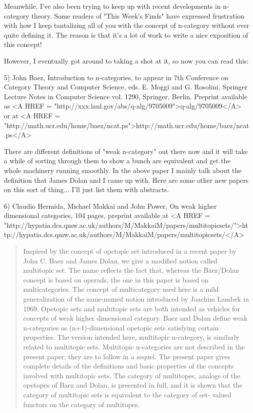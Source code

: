 Meanwhile, I've also been trying to keep up with recent developments
in n-category theory.  Some readers of "This Week's Finds" have expressed
frustration with how I keep tantalizing all of you with the concept of
n-category without ever quite defining it.  The reason is that it's a
lot of work to write a nice exposition of this concept!  

However, I eventually got around to taking a shot at it, so now you can
read this:

5) John Baez, Introduction to n-categories, to appear in
7th Conference on Category Theory and Computer Science, eds.
E. Moggi and G. Rosolini, Springer Lecture Notes in
Computer Science vol. 1290, Springer, Berlin.  Preprint available
as <A HREF = "http://xxx.lanl.gov/abs/q-alg/9705009">q-alg/9705009</A> or
at <A HREF = "http://math.ucr.edu/home/baez/ncat.ps">http://math.ucr.edu/home/baez/ncat.ps</A>

There are different definitions of "weak n-category" out there now and
it will take a while of sorting through them to show a bunch are
equivalent and get the whole machinery running smoothly.  In the
above paper I mainly talk about the definition that James Dolan
and I came up with.  Here are some other new papers on this sort of
thing... I'll just list them with abstracts.

6) Claudio Hermida, Michael Makkai and John Power, On weak higher 
dimensional categories, 104 pages, preprint available at 
<A HREF =
"http://hypatia.dcs.qmw.ac.uk/authors/M/MakkaiM/papers/multitopicsets/">http://hypatia.dcs.qmw.ac.uk/authors/M/MakkaiM/papers/multitopicsets/</A>

\begin{quote}
Inspired by the concept of opetopic set introduced in a recent
paper by John C. Baez and James Dolan, we give a modified notion
called multitopic set.  The name reflects the fact that, whereas
the Baez/Dolan concept is based on operads, the one in this paper
is based on multicategories.  The concept of multicategory used here
is a mild generalization of the same-named notion introduced by
Joachim Lambek in 1969.  Opetopic sets and multitopic sets are both
intended as vehicles for concepts of weak higher dimensional category.
Baez and Dolan define weak n-categories as (n+1)-dimensional opetopic
sets satisfying certain properties.  The version intended here, 
multitopic n-category, is similarly related to multitopic sets.  
Multitopic n-categories are not described in the present paper;
they are to follow in a sequel.  The present paper gives complete details
of the definitions and basic properties of the concepts involved with 
multitopic sets.  The category of multitopes, analogs of the opetopes
of Baez and Dolan, is presented in full, and it is shown that the 
category of multitopic sets is equivalent to the category of set-
valued functors on the category of multitopes.
\end{quote}
    

